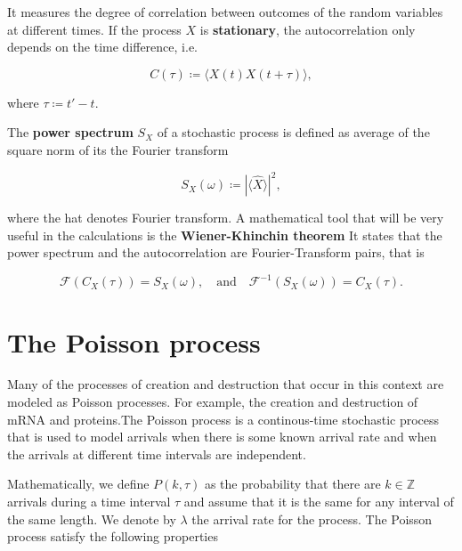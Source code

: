 It measures the degree of correlation between outcomes of the random variables at different times. If the process $X$ is \textbf{stationary}, the autocorrelation only depends on the time difference, i.e.

\begin{equation*}
  C(\tau) \coloneqq \langle X(t)X(t+\tau)\rangle,
\end{equation*}

where $\tau \coloneqq t'-t$.

The \textbf{power spectrum} $S_X$ of a stochastic process is defined as average of the square norm of its the Fourier transform

\begin{equation*}
  S_X(\omega) \coloneqq \left|\langle\hat X\rangle\right|^2,
\end{equation*}

where the hat denotes Fourier transform. A mathematical tool that will be very useful in the calculations is the \textbf{Wiener-Khinchin theorem} It states that the power spectrum and the autocorrelation are Fourier-Transform pairs, that is

\begin{equation}
  \label{eq:con-wkth}
  \mathscr{F}(C_X(\tau)) = S_X(\omega),\quad\text{and}\quad \mathscr{F}^{-1}(S_X(\omega)) = C_X(\tau).
\end{equation}

\section{The Poisson process}
\label{sec:poisson}

Many of the processes of creation and destruction that occur in this context are modeled as Poisson processes. For example, the creation and destruction of mRNA and proteins.The Poisson process is a continous-time stochastic process that is used to model arrivals when there is some known arrival rate and when the arrivals at different time intervals are independent.

Mathematically, we define $P(k,\tau)$ as the probability that there are $k\in\mathbb{Z}$ arrivals during a time interval $\tau$ and assume that it is the same for any interval of the same length. We denote by $\lambda$ the arrival rate for the process. The Poisson process satisfy the following properties

